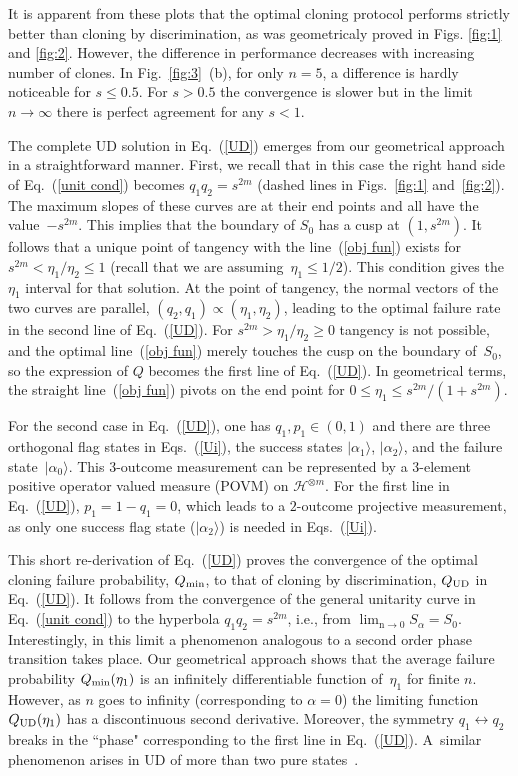 \documentclass[aps,prl,twocolumn,showpacs]{revtex4}
\begin{document}
It is apparent from these plots that the optimal cloning protocol performs strictly better than cloning by discrimination, as was geometricaly proved in Figs. \ref{fig:1} and \ref{fig:2}. However, the difference in performance decreases with increasing number of clones. In Fig.~\ref{fig:3}~(b), for only $n=5$, a difference is hardly noticeable for $s\le 0.5$. For $s > 0.5$ the convergence is slower but in the limit $n\to\infty$ there is perfect agreement for any $s<1$.

The complete UD solution in Eq.~(\ref{UD}) emerges from our geometrical approach in a straightforward manner. First, we recall that in this case the right hand side of Eq.~(\ref{unit cond}) becomes $q_1 q_2=s^{2m}$ (dashed lines in Figs.~\ref{fig:1} and~\ref{fig:2}). The maximum slopes of these curves are at their end points and all have the value~$-s^{2m}$. This implies that the boundary of $S_0$ has a cusp at $(1,s^{2m})$. It follows that a unique point of tangency with the line~(\ref{obj fun}) exists for $s^{2m}<\eta_1/\eta_2\le1$ (recall that we are assuming~$\eta_1\le1/2$). This condition gives the $\eta_1$ interval for that solution.  At the point of tangency, the normal vectors of the two curves are parallel, $(q_2,q_1)\propto (\eta_1,\eta_2)$, leading to the optimal failure rate in the second line of Eq.~(\ref{UD}). For $s^{2m}>\eta_1/\eta_2\ge0$ tangency is not possible, and the optimal line~(\ref{obj fun}) merely touches the cusp on the boundary of~$S_0$, so the expression of $Q$ becomes the first line of Eq.~(\ref{UD}). In geometrical terms, the straight line~(\ref{obj fun}) pivots on the end point for $0 \leq \eta_1 \leq s^{2m}/(1+s^{2m})$.

For the second case in Eq.~(\ref{UD}), one has $q_1,p_1\in(0,1)$ and there are three orthogonal flag states in Eqs.~(\ref{Ui}), the success states $|\alpha_1\rangle$, $|\alpha_2\rangle$, and the failure state~$|\alpha_{0}\rangle$. This $3$-outcome measurement can be represented by a $3$-element positive operator valued measure (POVM) on ${\mathscr H}^{\otimes m}$. For the first line in Eq.~(\ref{UD}), $p_1=1-q_1=0$, which leads to a $2$-outcome projective measurement, as only one success flag state ($|\alpha_2\rangle$) is needed in Eqs.~(\ref{Ui}). 

This short re-derivation of Eq.~(\ref{UD}) proves the convergence of the optimal cloning failure probability, $Q_{\rm min}$, to that of cloning by discrimination, $Q_{\rm UD}$ in Eq.~(\ref{UD}). It follows from the convergence of the general unitarity curve in Eq.~(\ref{unit cond}) to the hyperbola $q_1q_2=s^{2m}$, i.e., from $\lim_{{\mathrm n}\to 0} S_\alpha=S_0$. Interestingly, in this limit a phenomenon analogous to a second order phase transition takes place. Our geometrical approach shows that the average failure probability $Q_{\rm min}(\eta_1)$ is an infinitely differentiable function of~$\eta_1$ for finite $n$. However, as $n$ goes to infinity (corresponding to $\alpha=0$) the limiting function $Q_{\rm UD}(\eta_1)$ has a discontinuous second derivative. Moreover, the symmetry $q_1\leftrightarrow q_2$ breaks  in the ``phase" corresponding to the first line in Eq.~(\ref{UD}). A~similar phenomenon arises in UD of more than two pure states~\cite{Bergou1}.
\end{document}
